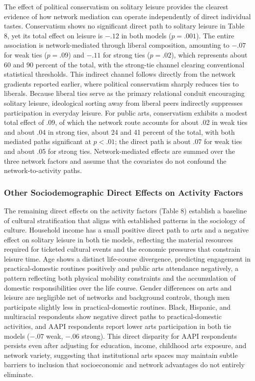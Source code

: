 \documentclass[
  12pt
]{article}
\begin{document}
The effect of political conservatism on solitary leisure provides the clearest evidence of how network mediation can operate independently of direct individual tastes. Conservatism shows no significant direct path to solitary leisure in Table 8, yet its total effect on leisure is $-.12$ in both models ($p = .001$). The entire association is network-mediated through liberal composition, amounting to $-.07$ for weak ties ($p = .09$) and $-.11$ for strong ties ($p = .02$), which represents about 60 and 90 percent of the total, with the strong-tie channel clearing conventional statistical thresholds. This indirect channel follows directly from the network gradients reported earlier, where political conservatism sharply reduces ties to liberals. Because liberal ties serve as the primary relational conduit encouraging solitary leisure, ideological sorting away from liberal peers indirectly suppresses participation in everyday leisure. For public arts, conservatism exhibits a modest total effect of .09, of which the network route accounts for about .02 in weak ties and about .04 in strong ties, about 24 and 41 percent of the total, with both mediated paths significant at $p < .01$; the direct path is about .07 for weak ties and about .05 for strong ties. Network-mediated effects are summed over the three network factors and assume that the covariates do not confound the network-to-activity paths.

\subsubsection{Other Sociodemographic Direct Effects on Activity Factors}\label{other-sociodemographic-direct-effects-on-activity-factors}

The remaining direct effects on the activity factors (Table 8) establish a baseline of cultural stratification that aligns with established patterns in the sociology of culture. Household income has a small positive direct path to arts and a negative effect on solitary leisure in both tie models, reflecting the material resources required for ticketed cultural events and the economic pressures that constrain leisure time. Age shows a distinct life-course divergence, predicting engagement in practical-domestic routines positively and public arts attendance negatively, a pattern reflecting both physical mobility constraints and the accumulation of domestic responsibilities over the life course. Gender differences on arts and leisure are negligible net of networks and background controls, though men participate slightly less in practical-domestic routines. Black, Hispanic, and multiracial respondents show negative direct paths to practical-domestic activities, and AAPI respondents report lower arts participation in both tie models ($-.07$ weak, $-.06$ strong). This direct disparity for AAPI respondents persists even after adjusting for education, income, childhood arts exposure, and network variety, suggesting that institutional arts spaces may maintain subtle barriers to inclusion that socioeconomic and network advantages do not entirely eliminate.
\end{document}
